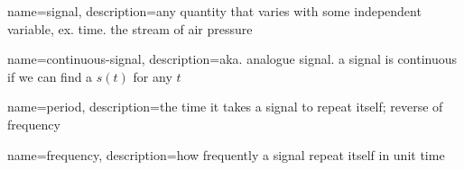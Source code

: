 {
  name=signal,
  description={any quantity that varies with some independent variable, ex. time.
  the stream of air pressure}
}

{
  name=continuous-signal,
  description={aka. analogue signal. a signal is continuous if we can find
  a $ s \left( t \right) $ for any $ t $}
}

{
  name=period,
  description={the time it takes a signal to repeat itself; reverse of
  frequency}
}

{
  name=frequency,
  description={how frequently a signal repeat itself in unit time}
}
